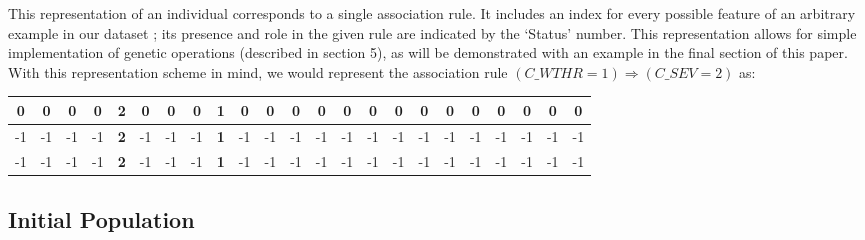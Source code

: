 \documentclass{amsart}
\theoremstyle{definition}
\theoremstyle{remark}
\numberwithin{equation}{section}
\begin{document}
This representation of an individual corresponds to a single association rule. It includes an index for every possible feature of an arbitrary example in our dataset \cite{datadict}; its presence and role in the given rule are indicated by the `Status' number. This representation allows for simple implementation of genetic operations (described in section 5), as will be demonstrated with an example in the final section of this paper. With this representation scheme in mind, we would represent the association rule $(C\_WTHR = 1)\Rightarrow (C\_SEV = 2)$ as:
\small
\begin{center}
\begin{tabular}{ | c | c | c | c | c | c | c | c | c | c | c | c | c | c | c | c | c | c | c | c | c | c | c |}
 \hline
 0 & 0 & 0 & 0 & \textbf{2} & 0 & 0 & 0 & \textbf{1} & 0 & 0 & 0 & 0 & 0 & 0 & 0 & 0 & 0 & 0 & 0 & 0 & 0 & 0 \\
 \hline
 -1 & -1 & -1 & -1 & \textbf{2} & -1 & -1 & -1 & \textbf{1} & -1 & -1 & -1 & -1 & -1 & -1 & -1 & -1 & -1 & -1 & -1 & -1 & -1 & -1 \\
\hline
 -1 & -1 & -1 & -1 & \textbf{2} & -1 & -1 & -1 & \textbf{1} & -1 & -1 & -1 & -1 & -1 & -1 & -1 & -1 & -1 & -1 & -1 & -1 & -1 & -1\\
\hline
\end{tabular}
\end{center}
\vspace{.5cm}
\normalsize

\subsection{Initial Population}
~\newline
\end{document}
